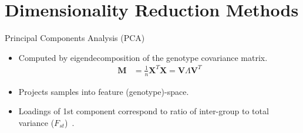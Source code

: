 \documentclass{beamer}
\begin{document}
\section{Dimensionality Reduction Methods}

\begin{frame}{Principal Components Analysis (PCA)}
  \begin{itemize}
    \item Computed by eigendecomposition of the genotype covariance matrix.
      \begin{align*}
        \textbf{M} &= \frac{1}{n} \textbf{X}^T\textbf{X} = \textbf{V} \textbf{$\Lambda$} \textbf{V}^T
      \end{align*}
    \item Projects samples into feature (genotype)-space.
    \item Loadings of 1st component correspond to ratio of inter-group to total
      variance ($F_{st}$)~\cite{mcvean_genealogical_2009}.
  \end{itemize}
\end{frame}
\end{document}
